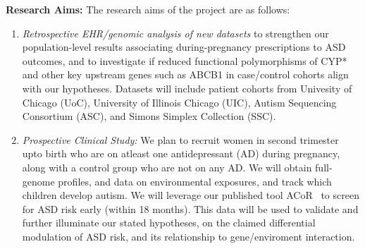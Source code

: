 \documentclass[onecolumn, compsoc,11pt]{IEEEtran}
\begin{document}
\textbf{Research Aims:} The research aims of the project are as follows:
\begin{enumerate}
\item \textit{Retrospective EHR/genomic analysis of new datasets} to  strengthen our population-level results associating during-pregnancy prescriptions to ASD outcomes, and  to investigate if reduced functional polymorphisms of CYP* and other key upstream genes such as ABCB1  in case/control cohorts  align with our hypotheses. Datasets will include patient cohorts from Univesity of Chicago (UoC), University of Illinois Chicago (UIC), Autism Sequencing Consortium (ASC), and Simons Simplex Collection (SSC).
\item \textit{Prospective Clinical Study:} We plan to recruit women in second trimester upto birth who are on atleast one antidepressant (AD) during pregnancy, along with a control group who are not on any AD. We will obtain full-genome profiles, and data on environmental exposures, and track which children develop autism. We will leverage our published tool ACoR~\cite{Onishchenko_2021} to screen for  ASD risk early (within 18 months). This data will be used to validate and further illuminate our stated hypotheses, on the claimed differential modulation of ASD risk, and its relationship to gene/enviroment interaction. %

\end{enumerate}
\end{document}
